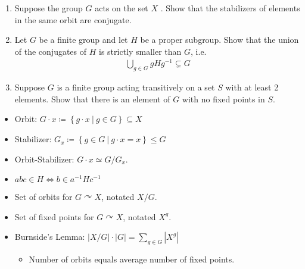 \begin{enumerate}
\def\labelenumi{\alph{enumi}.}
\item
  Suppose the group \(G\) acts on the set \(X\) . Show that the
  stabilizers of elements in the same orbit are conjugate.
\item
  Let \(G\) be a finite group and let \(H\) be a proper subgroup. Show
  that the union of the conjugates of \(H\) is strictly smaller than
  \(G\), i.e.
  \begin{align*}
  \displaystyle\bigcup_{g\in G} gHg^{-1}\subsetneq G
  \end{align*}
\item
  Suppose \(G\) is a finite group acting transitively on a set \(S\)
  with at least 2 elements. Show that there is an element of \(G\) with
  no fixed points in \(S\).
\end{enumerate}

\begin{concept}

\envlist

\begin{itemize}
\tightlist
\item
  Orbit:
  \(G\cdot x \coloneqq\left\{{g\cdot x {~\mathrel{\Big|}~}g\in G}\right\} \subseteq X\)
\item
  Stabilizer:
  \(G_x \coloneqq\left\{{g\in G{~\mathrel{\Big|}~}g\cdot x = x}\right\} \leq G\)
\item
  Orbit-Stabilizer: \(G\cdot x \simeq G/G_x\).
\item
  \(abc\in H \iff b\in a^{-1}H c^{-1}\)
\item
  Set of orbits for \(G\curvearrowright X\), notated \(X/G\).
\item
  Set of fixed points for \(G\curvearrowright X\), notated \(X^g\).
\item
  Burnside's Lemma:
  \({\left\lvert {X/G} \right\rvert} \cdot {\left\lvert {G} \right\rvert} = \sum_{g\in G} {\left\lvert {X^g} \right\rvert}\)

  \begin{itemize}
  \tightlist
  \item
    Number of orbits equals average number of fixed points.
  \end{itemize}
\end{itemize}

\end{concept}

